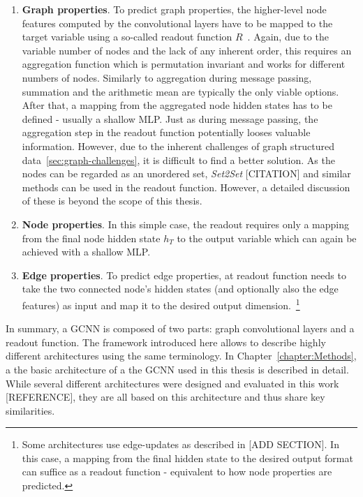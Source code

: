 \begin{enumerate}
	\item \textbf{Graph properties}. To predict graph properties, the higher-level node features computed by the convolutional layers have to be mapped to the target variable using a so-called readout function $R$~\cite{Gilmer2017}. Again, due to the variable number of nodes and the lack of any inherent order, this requires an aggregation function which is permutation invariant and works for different numbers of nodes. Similarly to aggregation during message passing, summation and the arithmetic mean are typically the only viable options. After that, a mapping from the aggregated node hidden states has to be defined - usually a shallow MLP.
	Just as during message passing, the aggregation step in the readout function potentially looses valuable information. However, due to the inherent challenges of graph structured data~\ref{sec:graph-challenges}, it is difficult to find a better solution. As the nodes can be regarded as an unordered set, \textit{Set2Set} [CITATION] and similar methods can be used in the readout function. However, a detailed discussion of these is beyond the scope of this thesis.
	\item \textbf{Node properties}. In this simple case, the readout requires only a mapping from the final node hidden state $h_T$ to the output variable which can again be achieved with a shallow MLP.
	\item \textbf{Edge properties}. To predict edge properties, at readout function needs to take the two connected node's hidden states (and optionally also the edge features) as input and map it to the desired output dimension.~\footnote{Some architectures use edge-updates as described in [ADD SECTION]. In this case, a mapping from the final hidden state to the desired output format can suffice as a readout function - equivalent to how node properties are predicted.}
\end{enumerate}


In summary, a GCNN is composed of two parts: graph convolutional layers and a readout function. The framework introduced here allows to describe highly different architectures using the same terminology. In Chapter~\ref{chapter:Methods}, a the basic architecture of a the GCNN used in this thesis is described in detail. While several different architectures were designed and evaluated in this work [REFERENCE], they are all based on this architecture and thus share key similarities.



